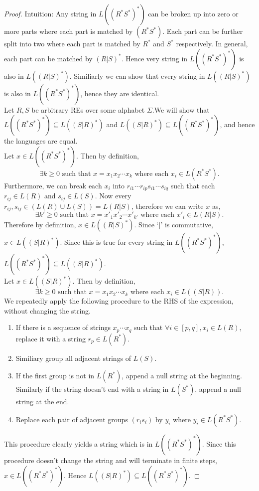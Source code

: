 \documentclass[11pt]{article}
\begin{document}
\begin{proof}
	Intuition: Any string in $L((R^* S^*)^*)$ can be broken up into zero or more parts
	where each part is matched by $(R^* S^*)$. Each part can be further split into two where
	each part is matched by $R^*$ and $S^*$ respectively. In general, each part can
	be matched by $(R|S)^*$. Hence very string in $L((R^* S^*)^*)$ is also in
	$L((R|S)^*)$.  Similiarly we can show that every string in $L((R|S)^*)$ is also
	in $L((R^* S^*)^*)$, hence they are identical. \\

	Let $R,S$ be arbitrary REs over some alphabet $\Sigma$.We will show that
	$L( ( R^* S^* )^* ) \subseteq L( ( S | R )^* )$ and $ L( ( S | R )^* ) \subseteq L( ( R^* S^* )^* )$,
	and hence the languages are equal. \\
	
	Let $x \in L(( R^*S^* )^*)$. Then by definition,
	\[ \exists k \geq 0 \text{ such that } x = x_1 x_2 \cdots x_k \text{ where each } x_i \in L(R^*S^*).\]
	Furthermore, we can break each $x_i$ into $r_{i1} \cdots r_{ip} s_{i1} \cdots s_{iq}$ such that each
	$r_{ij} \in L(R)$ and $s_{ij} \in L(S)$. Now every $r_{ij},s_{ij} \in (L(R) \cup L(S)) = L(R | S)$,
	therefore we can write $x$ as,
	\[ \exists k' \geq 0 \text{ such that } x = x'_1 x'_2 \cdots x'_{k'} \text{ where each } x'_i \in L(R | S). \]
	Therefore by definition, $x \in L((R|S)^*)$. Since `$|$' is commutative, $x \in L((S|R)^*)$. Since this
	is true for every string in $L( ( R^* S^* )^* )$, $L( ( R^* S^* )^* ) \subseteq L(( S | R )^*)$.\\
	
	Let $x \in L(( S | R )^*)$. Then by definition,
	\[ \exists k \geq 0 \text{ such that } x = x_1 x_2 \cdots x_k \text{ where each } x_i \in L((S|R)).\]
	We  repeatedly apply the following procedure to the RHS of the expression, without changing the string.
	\begin{enumerate}
		\item If there is a sequence of strings $x_p \cdots x_q$ such that $ \forall i \in [p,q], x_i \in L(R)$,
		replace it with a string $r_p \in L(R^*)$.
		\item Similiary group all adjacent strings of $L(S)$.
		\item If the first group is not in $L(R^*)$, append a null string at the beginning.
		Similarly if the string doesn't end with a string in $L(S^*)$, append a null string
		at the end.
		\item Replace each pair of adjacent groups $(r_is_i)$ by $y_i$ where $y_i \in L(R^*S^*)$.
	\end{enumerate}
	This procedure clearly yields a string which is in $L((R^*S^*)^*)$. Since this procedure
	doesn't change the string and will terminate in finite steps, $x \in L( ( R^* S^* )^* )$.
	Hence $ L( ( S | R )^* ) \subseteq L( ( R^* S^* )^* )$.
\end{proof}
\end{document}
